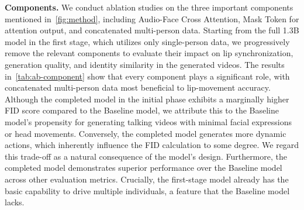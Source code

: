 \noindent \textbf{Components.}
We conduct ablation studies on the three important components mentioned in~\cref{fig:method}, including Audio-Face Cross Attention, Mask Token for attention output, and concatenated multi-person data.
Starting from the full 1.3B model in the first stage, which utilizes only single-person data, we progressively remove the relevant components to evaluate their impact on lip synchronization, generation quality, and identity similarity in the generated videos. 
The results in~\cref{tab:ab-component} show that every component plays a significant role, with concatenated multi-person data most beneficial to lip-movement accuracy.
Although the completed model in the initial phase exhibits a marginally higher FID score compared to the Baseline model, we attribute this to the Baseline model's propensity for generating talking videos with minimal facial expressions or head movements. 
Conversely, the completed model generates more dynamic actions, which inherently influence the FID calculation to some degree. 
We regard this trade-off as a natural consequence of the model's design. Furthermore, the completed model demonstrates superior performance over the Baseline model across other evaluation metrics. 
Crucially, the first-stage model already has the basic capability to drive multiple individuals, a feature that the Baseline model lacks.

